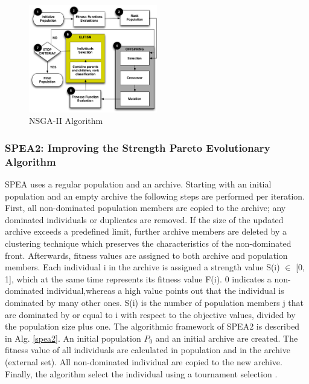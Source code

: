 \documentclass[espaco=umemeio,chapter=TITLE,twoside,openright]{abnt}
\begin{document}
\begin{figure}[h]
\centering
\includegraphics[width=0.5\textwidth]{./images/NSGA-2.png}
\caption{NSGA-II Algorithm}
\label{fig:nsga2}
\end{figure}

\subsubsection{SPEA2: Improving the Strength Pareto Evolutionary Algorithm}

SPEA uses a regular population and an archive. Starting with an initial population and an empty archive the following steps are performed per iteration. First, all non-dominated population members are copied to the archive; any dominated individuals or duplicates are removed. If the size of the updated archive exceeds a predefined limit, further archive members are deleted by a clustering technique which preserves the characteristics of the non-dominated front. Afterwards, fitness values are assigned to both archive and population members. Each individual i in the archive is assigned a strength value S(i) $\in$ [0, 1], which at the same time represents its fitness value F(i). 0 indicates a non-dominated individual,whereas a high value points out that the individual is dominated by many other ones. S(i) is the number of population members j that are dominated by or equal to i with respect to the objective values, divided by the population size plus one. The algorithmic framework of SPEA2 is described in Alg. \ref{spea2}. An initial population $P_{0}$ and an initial archive are created. The fitness value of all individuals are calculated in population and in the archive (external set). All non-dominated individual are copied to the new archive. Finally, the algorithm select the individual using a tournament selection \cite{Zitzler2001} \cite{Tervonen2017} \cite{MatneiFilho2016}.
\end{document}
